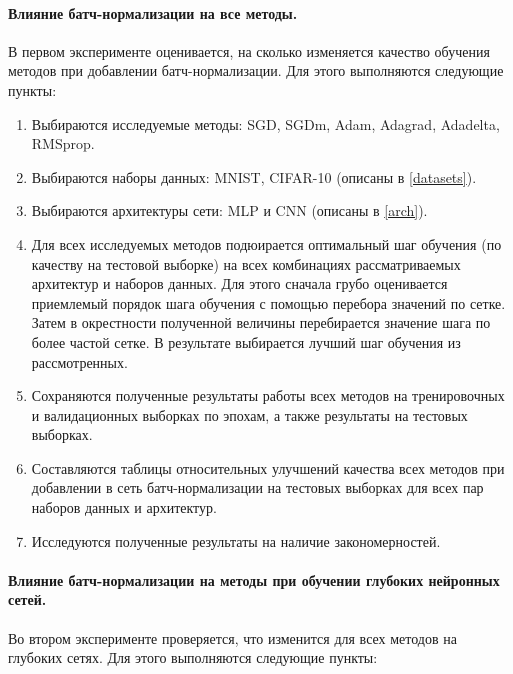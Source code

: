 \documentclass[12pt]{article}
\begin{document}
\newpage
\paragraph{Влияние батч-нормализации на все методы.\\}

В первом эксперименте оценивается, на сколько изменяется качество обучения методов при добавлении батч-нормализации. Для этого выполняются следующие пункты: 

\begin{enumerate}
\item Выбираются исследуемые методы: SGD, SGDm, Adam, Adagrad, Adadelta, RMSprop.
\item Выбираются наборы данных: MNIST, CIFAR-10 (описаны в \ref{datasets}).
\item Выбираются архитектуры сети: MLP и CNN (описаны в \ref{arch}).
\item Для всех исследуемых методов подюирается оптимальный шаг обучения (по качеству на тестовой выборке) на всех комбинациях рассматриваемых архитектур и наборов данных. Для этого сначала грубо оценивается приемлемый порядок шага обучения с помощью перебора значений по сетке. Затем в окрестности полученной величины перебирается значение шага по более частой сетке. В результате выбирается лучший шаг обучения из рассмотренных.
\item Сохраняются полученные результаты работы всех методов на тренировочных и валидационных выборках по эпохам, а также результаты на тестовых выборках.
\item Составляются таблицы относительных улучшений качества всех методов при добавлении в сеть батч-нормализации на тестовых выборках для всех пар наборов данных и архитектур.
\item Исследуются полученные результаты на наличие закономерностей.
\end{enumerate}


\paragraph{Влияние батч-нормализации на методы при обучении глубоких нейронных сетей.\\}

Во втором эксперименте проверяется, что изменится для всех методов на глубоких сетях. Для этого выполняются следующие пункты:
\end{document}
